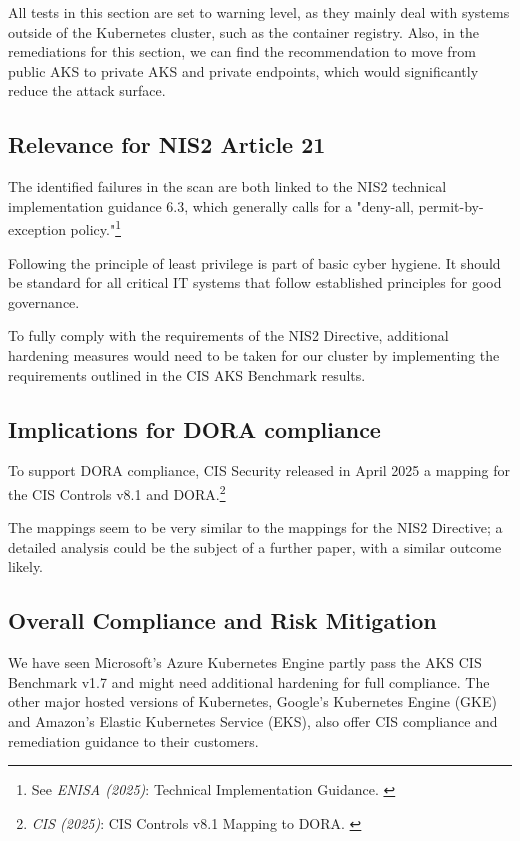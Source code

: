 All tests in this section are set to warning level, as they mainly deal with systems outside of the Kubernetes cluster, such as the container registry. Also, in the remediations for this section, we can find the recommendation to move from public AKS to private AKS and private endpoints, which would significantly reduce the attack surface.

\subsection{Relevance for NIS2 Article 21}

The identified failures in the scan are both linked to the NIS2 technical implementation guidance 6.3, which generally calls for a "deny-all, permit-by-exception policy."\footnote{See \textit{ENISA (2025)}: Technical Implementation Guidance. \cite{enisaTech}}

Following the principle of least privilege is part of basic cyber hygiene. It should be standard for all critical IT systems that follow established principles for good governance.

To fully comply with the requirements of the NIS2 Directive, additional hardening measures would need to be taken for our cluster by implementing the requirements outlined in the CIS AKS Benchmark results.

\subsection{Implications for DORA compliance}

To support DORA compliance, CIS Security released in April 2025 a mapping for the CIS Controls v8.1 and DORA.\footnote{\textit{CIS (2025)}: CIS Controls v8.1 Mapping to DORA. \cite{cisMapDora}}

The mappings seem to be very similar to the mappings for the NIS2 Directive; a detailed analysis could be the subject of a further paper, with a similar outcome likely.

\subsection{Overall Compliance and Risk Mitigation}

We have seen Microsoft's Azure Kubernetes Engine partly pass the AKS CIS Benchmark v1.7 and might need additional hardening for full compliance. The other major hosted versions of Kubernetes, Google's Kubernetes Engine (GKE) and Amazon's Elastic Kubernetes Service (EKS), also offer CIS compliance and remediation guidance to their customers.

